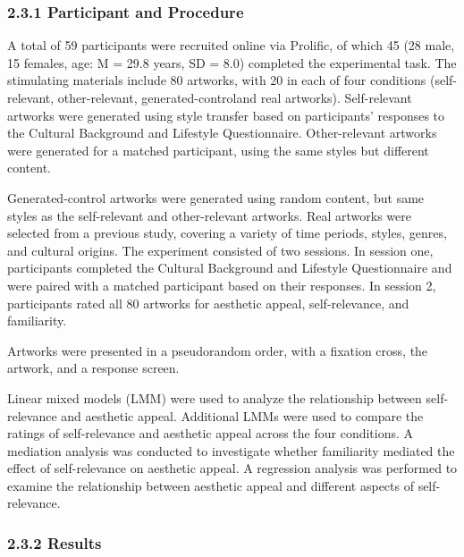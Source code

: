\documentclass[
  man]{apa6}
\begin{document}
\hypertarget{participant-and-procedure}{%
\subsubsection{2.3.1 Participant and Procedure}\label{participant-and-procedure}}

A total of 59 participants were recruited online via Prolific, of which 45 (28 male, 15 females, age: M = 29.8 years, SD = 8.0) completed the experimental task. The stimulating materials include 80 artworks, with 20 in each of four conditions (self-relevant, other-relevant, generated-controland real artworks). Self-relevant artworks were generated using style transfer based on participants' responses to the Cultural Background and Lifestyle Questionnaire. Other-relevant artworks were generated for a matched participant, using the same styles but different content.

Generated-control artworks were generated using random content, but same styles as the self-relevant and other-relevant artworks. Real artworks were selected from a previous study, covering a variety of time periods, styles, genres, and cultural origins. The experiment consisted of two sessions. In session one, participants completed the Cultural Background and Lifestyle Questionnaire and were paired with a matched participant based on their responses.
In session 2, participants rated all 80 artworks for aesthetic appeal, self-relevance, and familiarity.

Artworks were presented in a pseudorandom order, with a fixation cross, the artwork, and a response screen.

Linear mixed models (LMM) were used to analyze the relationship between self-relevance and aesthetic appeal. Additional LMMs were used to compare the ratings of self-relevance and aesthetic appeal across the four conditions. A mediation analysis was conducted to investigate whether familiarity mediated the effect of self-relevance on aesthetic appeal. A regression analysis was performed to examine the relationship between aesthetic appeal and different aspects of self-relevance.

\hypertarget{results-2}{%
\subsubsection{2.3.2 Results}\label{results-2}}
\end{document}
